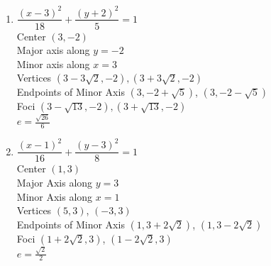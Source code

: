 \documentclass{ximera}
\begin{document}
\begin{multicols}{2}
\begin{enumerate}
\setcounter{enumi}{\value{HW}}

\item $\dfrac{(x - 3)^{2}}{18} + \dfrac{(y + 2)^{2}}{5} = 1$\\
Center $(3, -2)$\\
Major axis along $y = -2$\\
Minor axis along $x = 3$\\
Vertices $(3 - 3\sqrt{2}, -2), (3 + 3\sqrt{2}, -2)$\\
Endpoints of Minor Axis $(3,-2+\sqrt{5})$, $(3,-2-\sqrt{5})$\\
Foci $(3 - \sqrt{13}, -2), (3 + \sqrt{13}, -2)$\\
$e = \frac{\sqrt{26}}{6}$


\vfill

\columnbreak

\item $\dfrac{(x - 1)^{2}}{16} + \dfrac{(y - 3)^{2}}{8} = 1$\\
Center  $(1,3)$ \\
Major Axis along $y=3$\\
Minor Axis along $x=1$\\
Vertices $(5, 3)$, $(-3,3)$\\
Endpoints of Minor Axis $(1,3+2\sqrt{2})$, $(1,3-2\sqrt{2})$\\
Foci $(1 + 2 \sqrt{2}, 3)$, $(1-2 \sqrt{2},3)$\\
$e = \frac{\sqrt{2}}{2}$


\setcounter{HW}{\value{enumi}}
\end{enumerate}
\end{multicols}

\pagebreak
\end{document}
